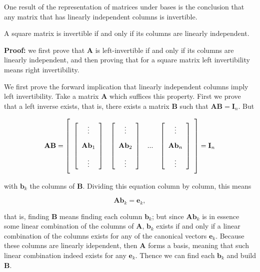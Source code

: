 	One result of the representation of matrices under bases is the conclusion that any matrix that has linearly independent columns is invertible.

\begin{theorem}\label{theo:invertiblematrix} %
	A square matrix is invertible if and only if its columns are linearly independent. \end{theorem}
\noindent\textbf{Proof:} we first prove that $\mathbf{A}$ is left-invertible if and only if its columns are linearly independent, and then proving that for a square matrix left invertibility means right invertibility.

	We first prove the forward implication that linearly independent columns imply left invertibility. Take a matrix $\mathbf{A}$ which suffices this property. First we prove that a left inverse exists, that is, there exists a matrix $\mathbf{B}$ such that $\mathbf{AB} = \mathbf{I}_n$. But

\begin{equation} \mathbf{AB} = \left[\raisebox{15mm}{} \begin{array}{cccc} \left[\begin{array}{c} \vdots \\[3mm] \mathbf{A}\mathbf{b}_1 \\[3mm] \vdots \end{array}\right] & \left[\begin{array}{c} \vdots \\[3mm] \mathbf{A}\mathbf{b}_2 \\[3mm] \vdots \end{array}\right] & ... & \left[\begin{array}{c} \vdots \\[3mm] \mathbf{A}\mathbf{b}_n \\[3mm] \vdots \end{array}\right]\end{array}\right] = \mathbf{I}_n \end{equation}

	\noindent with $\mathbf{b}_k$ the columns of $\mathbf{B}$. Dividing this equation column by column, this means

\begin{equation} \mathbf{Ab}_k = \mathbf{e}_k, \end{equation}

	\noindent that is, finding $\mathbf{B}$ means finding each column $\mathbf{b}_k$; but since $\mathbf{Ab}_k$ is in essence some linear combination of the columns of $\mathbf{A}$, $\mathbf{b}_k$ exists if and only if a linear combination of the columns exists for any of the canonical vectors $\mathbf{e}_k$. Because these columns are linearly idependent, then $\mathbf{A}$ forms a basis, meaning that such linear combination indeed exists for any $\mathbf{e}_k$. Thence we can find each $\mathbf{b}_k$ and build $\mathbf{B}$.

